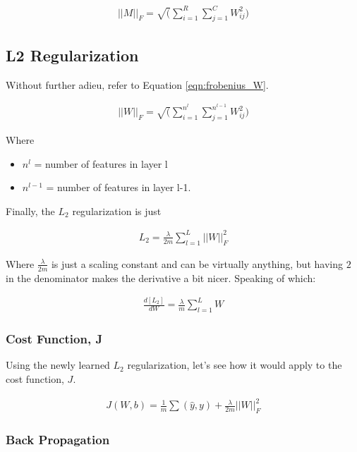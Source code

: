 \documentclass{article}
\begin{document}
\begin{align} \label{eqn:frobenius}
||M||_{F} = \sqrt(\sum_{i=1}^{R} \sum_{j=1}^{C} W_{ij}^{2})
\end{align}

\subsection{L2 Regularization}

Without further adieu, refer to Equation \ref{eqn:frobenius_W}.

\begin{align} \label{eqn:frobenius_W}
||W||_{F} = \sqrt(\sum_{i=1}^{n^{l}} \sum_{j=1}^{n^{l-1}} W_{ij}^{2})
\end{align}

Where
\begin{itemize}
\item $n^{l}$ = number of features in layer l
\item $n^{l-1}$ = number of features in layer l-1.
\end{itemize}

Finally, the $L_{2}$ regularization is just

\begin{gather}
L_{2} = \frac{\lambda}{2m} \sum_{l=1}^{L} ||W||_{F}^{2}
\end{gather}

Where $\frac{\lambda}{2m}$ is just a scaling constant and can be virtually anything, but having $2$ in the denominator makes the derivative a bit nicer.  Speaking of which:

\begin{gather}
\frac{d[L_{2}]}{dW} = \frac{\lambda}{m} \sum_{l=1}^{L} W
\end{gather}

\subsubsection{Cost Function, J}

Using the newly learned $L_2$ regularization, let's see how it would apply to the cost function, $J$.

\begin{gather}
J(W, b) = \frac{1}{m} \sum(\hat{y}, y) + \frac{\lambda}{2m} ||W||_{F}^{2}
\end{gather}

\subsubsection{Back Propagation}
\end{document}
